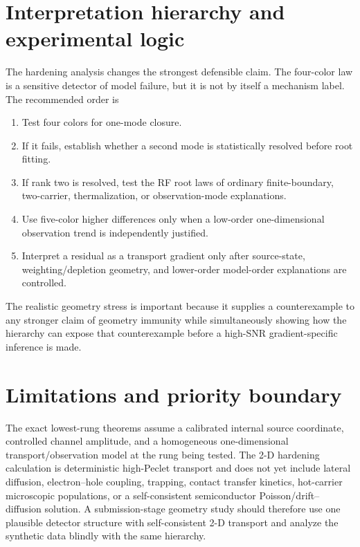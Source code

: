 \documentclass[11pt]{article}
\begin{document}
\section{Interpretation hierarchy and experimental logic}
The hardening analysis changes the strongest defensible claim. The four-color law is a sensitive detector of model failure, but it is not by itself a mechanism label. The recommended order is
\begin{enumerate}[label=\arabic*.]
\item Test four colors for one-mode closure.
\item If it fails, establish whether a second mode is statistically resolved before root fitting.
\item If rank two is resolved, test the RF root laws of ordinary finite-boundary, two-carrier, thermalization, or observation-mode explanations.
\item Use five-color higher differences only when a low-order one-dimensional observation trend is independently justified.
\item Interpret a residual as a transport gradient only after source-state, weighting/depletion geometry, and lower-order model-order explanations are controlled.
\end{enumerate}
The realistic geometry stress is important because it supplies a counterexample to any stronger claim of geometry immunity while simultaneously showing how the hierarchy can expose that counterexample before a high-SNR gradient-specific inference is made.

\section{Limitations and priority boundary}
The exact lowest-rung theorems assume a calibrated internal source coordinate, controlled channel amplitude, and a homogeneous one-dimensional transport/observation model at the rung being tested. The 2-D hardening calculation is deterministic high-Peclet transport and does not yet include lateral diffusion, electron--hole coupling, trapping, contact transfer kinetics, hot-carrier microscopic populations, or a self-consistent semiconductor Poisson/drift--diffusion solution. A submission-stage geometry study should therefore use one plausible detector structure with self-consistent 2-D transport and analyze the synthetic data blindly with the same hierarchy.
\end{document}
